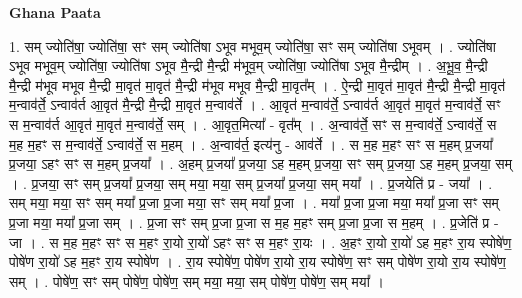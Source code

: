 \documentclass[17pt]{extarticle}
\begin{document}
\textbf{Ghana Paata } \newline

1. सम् ज्योति॑षा॒ ज्योति॑षा॒ सꣳ सम् ज्योति॑षा ऽभूव मभूव॒म् ज्योति॑षा॒ सꣳ सम् ज्योति॑षा ऽभूवम् । . ज्योति॑षा ऽभूव मभूव॒म् ज्योति॑षा॒ ज्योति॑षा ऽभूव मै॒न्द्री मै॒न्द्री म॑भूव॒म् ज्योति॑षा॒ ज्योति॑षा ऽभूव मै॒न्द्रीम् । . अ॒भू॒व॒ मै॒न्द्री मै॒न्द्री म॑भूव मभूव मै॒न्द्री मा॒वृत॑ मा॒वृत॑ मै॒न्द्री म॑भूव मभूव मै॒न्द्री मा॒वृत᳚म् । . ऐ॒न्द्री मा॒वृत॑ मा॒वृत॑ मै॒न्द्री मै॒न्द्री मा॒वृत॑ म॒न्वाव॑र्ते॒ ऽन्वाव॑र्त आ॒वृत॑ मै॒न्द्री मै॒न्द्री मा॒वृत॑ म॒न्वाव॑र्ते । . आ॒वृत॑ म॒न्वाव॑र्ते॒ ऽन्वाव॑र्त आ॒वृत॑ मा॒वृत॑ म॒न्वाव॑र्ते॒ सꣳ स म॒न्वाव॑र्त आ॒वृत॑ मा॒वृत॑ म॒न्वाव॑र्ते॒ सम् । . आ॒वृत॒मित्या᳚ - वृत᳚म् । . अ॒न्वाव॑र्ते॒ सꣳ स म॒न्वाव॑र्ते॒ ऽन्वाव॑र्ते॒ स म॒ह म॒हꣳ स म॒न्वाव॑र्ते॒ ऽन्वाव॑र्ते॒ स म॒हम् । . अ॒न्वाव॑र्त॒ इत्य॑नु - आव॑र्ते । . स म॒ह म॒हꣳ सꣳ स म॒हम् प्र॒जया᳚ प्र॒जया॒ ऽहꣳ सꣳ स म॒हम् प्र॒जया᳚ । . अ॒हम् प्र॒जया᳚ प्र॒जया॒ ऽह म॒हम् प्र॒जया॒ सꣳ सम् प्र॒जया॒ ऽह म॒हम् प्र॒जया॒ सम् । . प्र॒जया॒ सꣳ सम् प्र॒जया᳚ प्र॒जया॒ सम् मया॒ मया॒ सम् प्र॒जया᳚ प्र॒जया॒ सम् मया᳚ । . प्र॒जयेति॑ प्र - जया᳚ । . सम् मया॒ मया॒ सꣳ सम् मया᳚ प्र॒जा प्र॒जा मया॒ सꣳ सम् मया᳚ प्र॒जा । . मया᳚ प्र॒जा प्र॒जा मया॒ मया᳚ प्र॒जा सꣳ सम् प्र॒जा मया॒ मया᳚ प्र॒जा सम् । . प्र॒जा सꣳ सम् प्र॒जा प्र॒जा स म॒ह म॒हꣳ सम् प्र॒जा प्र॒जा स म॒हम् । . प्र॒जेति॑ प्र - जा । . स म॒ह म॒हꣳ सꣳ स म॒हꣳ रा॒यो रा॒यो॑ ऽहꣳ सꣳ स म॒हꣳ रा॒यः । . अ॒हꣳ रा॒यो रा॒यो॑ ऽह म॒हꣳ रा॒य स्पोषे॑ण॒ पोषे॑ण रा॒यो॑ ऽह म॒हꣳ रा॒य स्पोषे॑ण । . रा॒य स्पोषे॑ण॒ पोषे॑ण रा॒यो रा॒य स्पोषे॑ण॒ सꣳ सम् पोषे॑ण रा॒यो रा॒य स्पोषे॑ण॒ सम् । . पोषे॑ण॒ सꣳ सम् पोषे॑ण॒ पोषे॑ण॒ सम् मया॒ मया॒ सम् पोषे॑ण॒ पोषे॑ण॒ सम् मया᳚ । \newline
\end{document}
